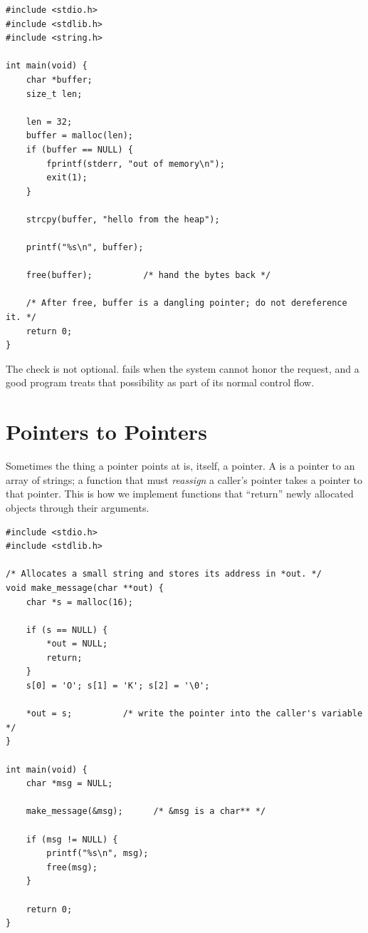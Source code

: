 \begin{lstlisting}[caption={A correct heap round-trip.}]
#include <stdio.h>
#include <stdlib.h>
#include <string.h>

int main(void) {
    char *buffer;
    size_t len;

    len = 32;
    buffer = malloc(len);
    if (buffer == NULL) {
        fprintf(stderr, "out of memory\n");
        exit(1);
    }

    strcpy(buffer, "hello from the heap");

    printf("%s\n", buffer);

    free(buffer);          /* hand the bytes back */

    /* After free, buffer is a dangling pointer; do not dereference it. */
    return 0;
}
\end{lstlisting}

The  check is not optional.  fails when the
system cannot honor the request, and a good program treats that
possibility as part of its normal control flow.

\section{Pointers to Pointers}

Sometimes the thing a pointer points at is, itself, a pointer. A
 is a pointer to an array of strings; a function that
must \emph{reassign} a caller's pointer takes a pointer to that pointer.
This is how we implement functions that ``return'' newly allocated
objects through their arguments.

\begin{lstlisting}[caption={Writing a new pointer into a caller's variable.}]
#include <stdio.h>
#include <stdlib.h>

/* Allocates a small string and stores its address in *out. */
void make_message(char **out) {
    char *s = malloc(16);

    if (s == NULL) {
        *out = NULL;
        return;
    }
    s[0] = 'O'; s[1] = 'K'; s[2] = '\0';

    *out = s;          /* write the pointer into the caller's variable */
}

int main(void) {
    char *msg = NULL;

    make_message(&msg);      /* &msg is a char** */

    if (msg != NULL) {
        printf("%s\n", msg);
        free(msg);
    }

    return 0;
}
\end{lstlisting}

